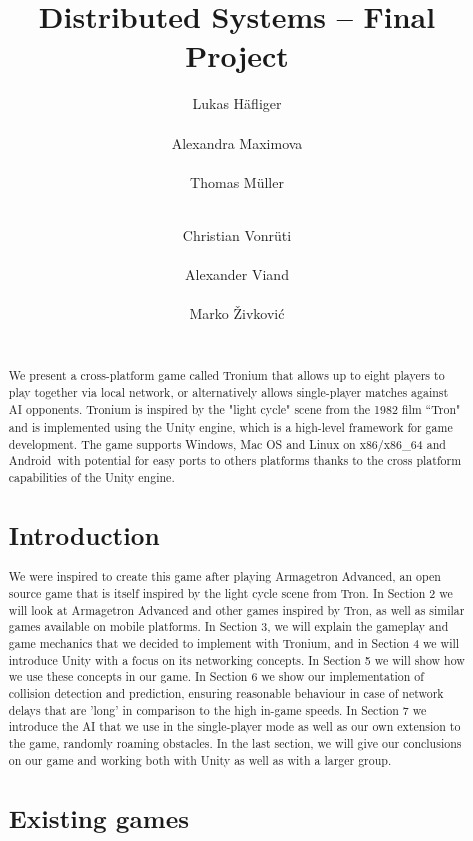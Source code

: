 \documentclass{report}
\title{Distributed Systems -- Final Project}
\author{
%
%
\alignauthor Lukas Häfliger\\
	\affaddr{ETH ID 11-916-376}\\
	\email{haelukas@student.ethz.ch}
\alignauthor Alexandra Maximova\\
 	\affaddr{ETH ID 09-913-534}\\
 	\email{amaximov@student.ethz.ch}
 	\alignauthor Thomas Müller\\
 	\affaddr{ETH ID 11-946-936}\\
 	\email{muelltho@student.ethz.ch} 
\and  %
\alignauthor Christian Vonrüti\\
 	\affaddr{ETH ID 11-930-914}\\
 	\email{cvonruet@student.ethz.ch} 
\alignauthor Alexander Viand\\
	\affaddr{ETH ID 09-940-131}\\
	\email{vianda@student.ethz.ch}
\alignauthor Marko Živković\\
	\affaddr{ETH ID 10-921-211}\\
	\email{markoz@student.ethz.ch}
}
\begin{document}
\maketitle

\begin{abstract}
We present a cross-platform game called Tronium that allows up to eight players to play together via local network, 
or alternatively allows single-player matches against AI opponents. 
Tronium is inspired by the "light cycle" scene from the 1982 film ``Tron" and is implemented using the  Unity\textsuperscript{\textregistered} 
engine, which is a high-level framework for game development.
The game supports Windows, Mac OS and Linux on x86/x86\_64 and Android\texttrademark \ 
with potential for easy ports to others platforms thanks to the cross platform capabilities of the Unity  engine.


 
\section{Introduction}

We were inspired to create this game after playing Armagetron Advanced, an open source game that is itself inspired by the light cycle scene from Tron. 
In Section 2 we will look at Armagetron Advanced and other games inspired by Tron, as well as similar games available on mobile platforms.
In Section 3, we will explain the gameplay and game mechanics that we decided to implement with Tronium, and in  Section 4 we will introduce Unity with a focus on its networking concepts. In Section 5 we will show how we use these concepts in our game. 
In Section 6 we show our implementation of collision detection and prediction, ensuring reasonable behaviour in case of network delays that are 'long' in comparison to the high in-game speeds.
In Section 7 we introduce the AI that we use in the single-player mode as well as our own extension to the game,  randomly roaming obstacles.
In the last section, we will give our conclusions on our game and working both with Unity as well as with a larger group.

 
\section{Existing games}


\end{abstract}
\end{document}
